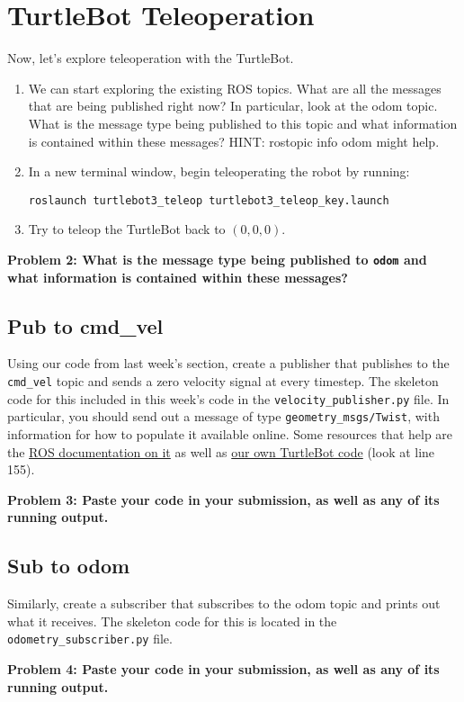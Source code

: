 \section{TurtleBot Teleoperation}

Now, let's explore teleoperation with the TurtleBot.

\begin{enumerate}
\item We can start exploring the existing ROS topics. What are all the messages that are being published right now? In particular, look at the odom topic. What is the message type being published to this topic and what information is contained within these messages? HINT: rostopic info odom might help.
\item In a new terminal window, begin teleoperating the robot by running:
\begin{lstlisting}
roslaunch turtlebot3_teleop turtlebot3_teleop_key.launch
\end{lstlisting}
\item Try to teleop the TurtleBot back to $(0,0,0)$.
\end{enumerate}

{\bf Problem 2: What is the message type being published to \texttt{odom} and what information is contained within these messages?}

\subsection{Pub to cmd\_vel}
Using our code from last week's section, create a publisher that publishes to the \texttt{cmd\_vel} topic and sends a zero velocity signal at every timestep. The skeleton code for this included in this week's code in the \texttt{velocity\_publisher.py} file. In particular, you should send out a message of type \texttt{geometry\_msgs/Twist}, with information for how to populate it available online. Some resources that help are the \href{http://docs.ros.org/melodic/api/geometry_msgs/html/msg/Twist.html}{ROS documentation on it} as well as \href{https://github.com/StanfordASL/asl_turtlebot/blob/master/scripts/keyboard_teleop.py}{our own TurtleBot code} (look at line 155).

{\bf Problem 3: Paste your code in your submission, as well as any of its running output.}

\subsection{Sub to odom}
Similarly, create a subscriber that subscribes to the odom topic and prints out what it receives. The skeleton code for this is located in the \texttt{odometry\_subscriber.py} file.

{\bf Problem 4: Paste your code in your submission, as well as any of its running output.}